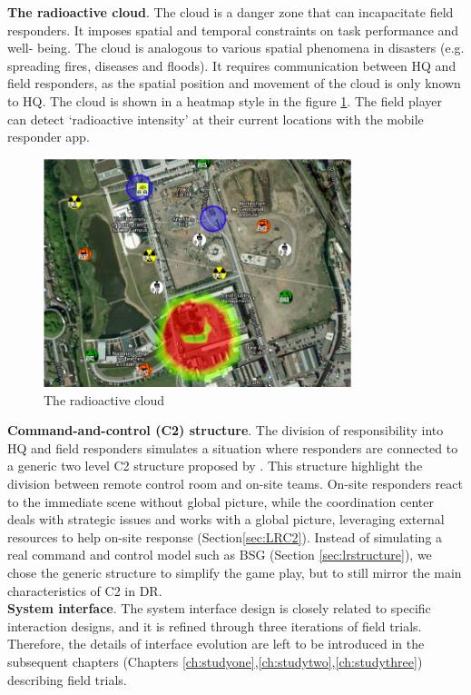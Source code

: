 \textbf{The radioactive cloud}. The cloud is a danger zone that can incapacitate field responders. It imposes spatial and temporal constraints on task performance and well- being. The cloud is analogous to various spatial phenomena in disasters (e.g. spreading fires, diseases and floods). It requires communication between HQ and field responders, as the spatial position and movement of the cloud is only known to HQ. The cloud is shown in a heatmap style in the figure \ref{fig:cloud}. The field player can detect `radioactive intensity' at their current locations with the mobile responder app.\\

\begin{figure}[h]
  \centering
  \includegraphics[width=0.8\textwidth]{img/approach/radioactiveCloud}
  \caption{The radioactive cloud}
  \label{fig:cloud}
\end{figure}

\textbf{Command-and-control (C2) structure}. The division of responsibility into HQ and field responders simulates a situation where  responders are connected to a generic two level \ac{C2} structure proposed by \cite{Chen2005}. This structure highlight the division between remote control room and on-site teams.  On-site responders react to the immediate scene without global picture, while the coordination center deals with strategic issues and works with a global picture, leveraging external resources to help on-site response (Section\ref{sec:LRC2}). Instead of simulating a real command and control model such as \ac{BSG} (Section \ref{sec:lrstructure}), we chose the generic structure to simplify the game play, but to still mirror the main characteristics of \ac{C2} in \ac{DR}. \\

\textbf{System interface}. The system interface design is closely related to specific interaction designs, and it is refined through three iterations of field trials. Therefore, the details of interface evolution are left to be introduced in the subsequent chapters (Chapters \ref{ch:studyone},\ref{ch:studytwo},\ref{ch:studythree}) describing field trials. \\



